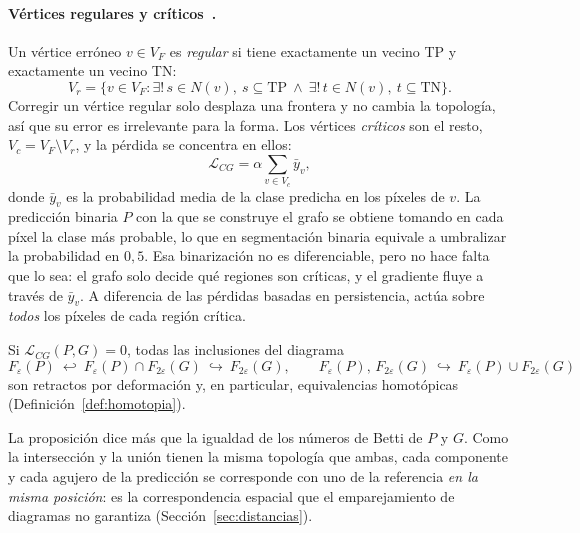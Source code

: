 \paragraph{Vértices regulares y críticos~\cite[§2.2--2.3]{lux2025}.} Un
vértice erróneo $v\in V_F$ es \emph{regular} si tiene exactamente un vecino
TP y exactamente un vecino TN:
\[
  V_r=\{v\in V_F : \exists!\,s\in N(v),\ s\subseteq\mathrm{TP}\ \wedge\
                  \exists!\,t\in N(v),\ t\subseteq\mathrm{TN}\}.
\]
Corregir un vértice regular solo desplaza una frontera y no cambia la
topología, así que su error es irrelevante para la forma. Los vértices
\emph{críticos} son el resto, $V_c=V_F\setminus V_r$, y la pérdida se
concentra en ellos:
\[
  \mathcal{L}_{CG}=\alpha\sum_{v\in V_c}\bar y_v,
\]
donde $\bar y_v$ es la probabilidad media de la clase predicha en los
píxeles de $v$. La predicción binaria $P$ con la que se construye el
grafo se obtiene tomando en cada píxel la clase más probable, lo que en
segmentación binaria equivale a umbralizar la probabilidad en $0{,}5$.
Esa binarización no es diferenciable, pero no hace falta que lo sea: el
grafo solo decide qué regiones son críticas, y el gradiente fluye a
través de $\bar y_v$. A diferencia de las pérdidas basadas en
persistencia, actúa sobre \emph{todos} los píxeles de cada región
crítica.

\begin{proposicion}
Si $\mathcal{L}_{CG}(P,G)=0$, todas las inclusiones del diagrama
\[
  F_\varepsilon(P)\ \hookleftarrow\ F_\varepsilon(P)\cap F_{2\varepsilon}(G)
  \ \hookrightarrow\ F_{2\varepsilon}(G),\qquad
  F_\varepsilon(P),\,F_{2\varepsilon}(G)\ \hookrightarrow\
  F_\varepsilon(P)\cup F_{2\varepsilon}(G)
\]
son retractos por deformación y, en particular, equivalencias homotópicas
(Definición~\ref{def:homotopia}).
\end{proposicion}

La proposición dice más que la igualdad de los números de Betti de $P$ y
$G$. Como la intersección y la unión tienen la misma topología que ambas,
cada componente y cada agujero de la predicción se corresponde con uno de la
referencia \emph{en la misma posición}: es la correspondencia espacial que
el emparejamiento de diagramas no garantiza (Sección~\ref{sec:distancias}).

